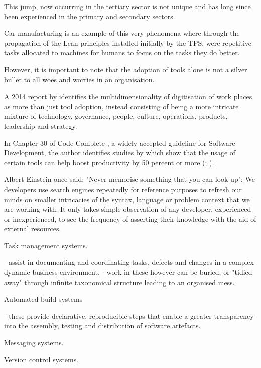This jump, now occurring in the tertiary sector is not unique and has long since been experienced in the primary and secondary sectors. 

Car manufacturing is an example of this very phenomena where through the propagation of the Lean principles installed initially by the TPS, were repetitive tasks allocated to machines for humans to focus on the tasks they do better.%

However, it is important to note that the adoption of tools alone is not a silver bullet to all woes and worries in an organisation. 

A 2014 report by \citeauthor{azhari2014digital} identifies the multidimensionality of digitisation of work places as more than just tool adoption, instead consisting of being a more intricate mixture of technology, governance, people, culture, operations, products, leadership and strategy.

In Chapter 30 of Code Complete \parencite{codeComplete}, a widely accepted guideline for Software Development, the author identifies studies by which show that the usage of certain tools can help boost productivity by 50 percent or more (\cite{jones2000software}; \citeauthor{boehm2000software} \citeyear{boehm2000software}).


Albert Einstein once said: "Never memorise something that you can look up"; We developers use search engines repeatedly for reference purposes to refresh our minds on smaller intricacies of the syntax, language or problem context that we are working with. It only takes simple observation of any developer, experienced or inexperienced, to see the frequency of asserting their knowledge with the aid of external resources.

Task management systems.

- assist in documenting and coordinating tasks, defects and changes in a complex dynamic business environment.
- work in these however can be buried, or "tidied away" through infinite taxonomical structure leading to an organised mess.

Automated build systems 

- these provide declarative, reproducible steps that enable a greater transparency into the assembly, testing and distribution of software artefacts.

Messaging systems.

Version control systems.


